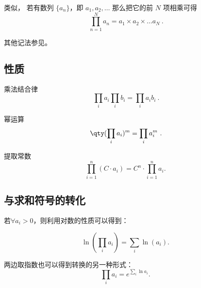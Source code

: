
\begin{issues}
\issueDraft
\end{issues}

类似， 若有数列 $\{a_n\}$，即 $a_1, a_2, \dots$ 那么把它的前 $N$ 项相乘可得
\begin{equation}
\prod_{n = 1}^N a_n = a_1\times a_2\times \dots a_N~.
\end{equation}

其他记法参见。

\subsection{性质}

乘法结合律
\begin{equation}
\prod_i a_i \prod_i b_i =  \prod_{i} a_i b_i~.
\end{equation}

幂运算
\begin{equation}
\qty(\prod_i a_i)^m =  \prod_i a_i^m~.
\end{equation}

提取常数
\begin{equation}
\prod_{i=1}^n (C \cdot a_i) = C^n \cdot \prod_{i=1}^n a_i.~
\end{equation}

\subsection{与求和符号的转化}

若$\forall a_i > 0$，则利用对数的性质可以得到：

\begin{equation}
\ln \left( \prod_i a_i \right) = \sum_i \ln(a_i).~
\end{equation}

两边取指数也可以得到转换的另一种形式：
\begin{equation}
\prod_i a_i = e^{\displaystyle\sum_i \ln {a_i}}.~
\end{equation}


